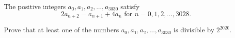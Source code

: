 The positive integers $a_0, a_1, a_2, \ldots, a_{3030}$ satisfy $$2a_{n + 2} = a_{n + 1} + 4a_n \text{ for } n = 0, 1, 2, \ldots, 3028.$$

Prove that at least one of the numbers $a_0, a_1, a_2, \ldots, a_{3030}$ is divisible by $2^{2020}$.
